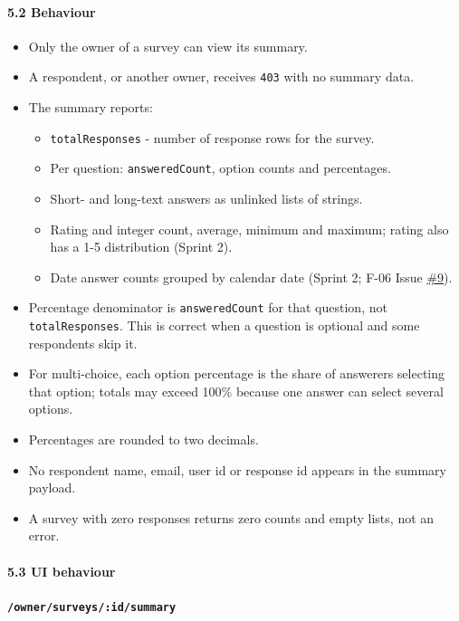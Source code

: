 \documentclass[12pt,a4paper]{article}
\begin{document}
\paragraph*{5.2 Behaviour}
\begin{itemize}[leftmargin=*]
\item Only the owner of a survey can view its summary.
\item A respondent, or another owner, receives \texttt{403} with no summary data.
\item The summary reports:
\begin{itemize}[leftmargin=*]
\item \texttt{totalResponses} - number of response rows for the survey.
\item Per question: \texttt{answeredCount}, option counts and percentages.
\item Short- and long-text answers as unlinked lists of strings.
\item Rating and integer count, average, minimum and maximum; rating also has a 1-5 distribution (Sprint 2).
\item Date answer counts grouped by calendar date (Sprint 2; F-06 Issue \href{https://github.com/Snnn3/SurveyHub/issues/9}{\#9}).
\end{itemize}
\item Percentage denominator is \texttt{answeredCount} for that question, not \texttt{totalResponses}. This is correct when a question is optional and some respondents skip it.
\item For multi-choice, each option percentage is the share of answerers selecting that option; totals may exceed 100\% because one answer can select several options.
\item Percentages are rounded to two decimals.
\item No respondent name, email, user id or response id appears in the summary payload.
\item A survey with zero responses returns zero counts and empty lists, not an error.
\end{itemize}

\paragraph*{5.3 UI behaviour}
\textbf{\texttt{/owner/surveys/:id/summary}}
\end{document}
